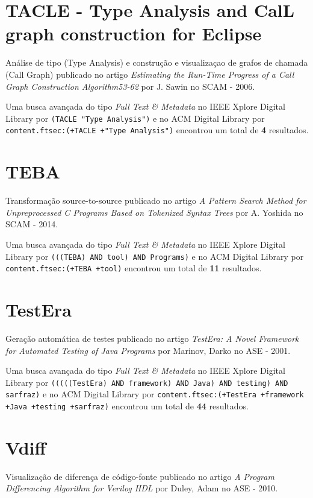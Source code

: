 \section{TACLE - Type Analysis and CalL graph construction for Eclipse}

Análise de tipo (Type Analysis) e construção e visualizaçao de grafos de chamada (Call Graph)
publicado no artigo
{\it Estimating the Run-Time Progress of a Call Graph Construction Algorithm53-62}
por
J. Sawin
no
SCAM
-
2006.


Uma busca avançada do tipo {\it Full Text \& Metadata} no IEEE Xplore Digital Library por
\texttt{(TACLE "Type Analysis")}
e no ACM Digital Library por
\texttt{content.ftsec:(+TACLE +"Type Analysis")}
encontrou um total de
{\bf 4}
resultados.

\section{TEBA}

Transformação source-to-source
publicado no artigo
{\it A Pattern Search Method for Unpreprocessed C Programs Based on Tokenized Syntax Trees}
por
A. Yoshida
no
SCAM
-
2014.


Uma busca avançada do tipo {\it Full Text \& Metadata} no IEEE Xplore Digital Library por
\texttt{(((TEBA) AND tool) AND Programs)}
e no ACM Digital Library por
\texttt{content.ftsec:(+TEBA +tool)}
encontrou um total de
{\bf 11}
resultados.

\section{TestEra}

Geração automática de testes
publicado no artigo
{\it TestEra: A Novel Framework for Automated Testing of Java Programs}
por
Marinov, Darko
no
ASE
-
2001.


Uma busca avançada do tipo {\it Full Text \& Metadata} no IEEE Xplore Digital Library por
\texttt{(((((TestEra) AND framework) AND Java) AND testing) AND sarfraz)}
e no ACM Digital Library por
\texttt{content.ftsec:(+TestEra +framework +Java +testing +sarfraz)}
encontrou um total de
{\bf 44}
resultados.

\section{Vdiff}

Visualização de diferença de código-fonte
publicado no artigo
{\it A Program Differencing Algorithm for Verilog HDL}
por
Duley, Adam
no
ASE
-
2010.



